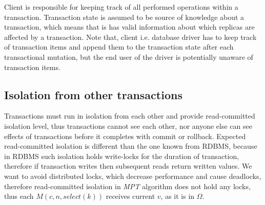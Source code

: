 \documentclass[runningheads,a4paper]{llncs}
\newcommand{\beginTransactionMessage}{$\mathit{M}(c, n, \mathit{begin\_transaction}())$\xspace}
\newcommand{\initialTxStateMessage}{$\mathit{M}(n, c, \mathit{initial\_transaction\_state}(\Lambda_{0}))$\xspace}
\newcommand{\selectMessage}{$\mathit{M}(c,n,select(k))$\xspace}
\newcommand{\database}{$\Omega$\xspace}
\newcommand{\mpt}{\emph{MPT}\xspace}
\begin{document}

Client is responsible for keeping track of all performed operations within a transaction. Transaction state is assumed to be source of knowledge about a transaction, which means that is has valid information about which replicas are affected by a transaction. Note that, client i.e. database driver has to keep track of transaction items and append them to the transaction state after each transactional mutation, but the end user of the driver is potentially unaware of transaction items.

\subsection{Isolation from other transactions}
Transactions must run in isolation from each other and provide read-committed isolation level, thus transactions cannot see each other, nor anyone else can see effects of transactions before it completes with commit or rollback. Expected read-committed isolation is different than the one known from RDBMS, because in RDBMS such isolation holds write-locks for the duration of transaction, therefore if transaction writes then subsequent reads return written values. We want to avoid distributed locks, which decrease performance and cause deadlocks, therefore read-committed isolation in \mpt algorithm does not hold any locks, thus each \selectMessage receives current $v$, as it is in \database.

\end{document}
